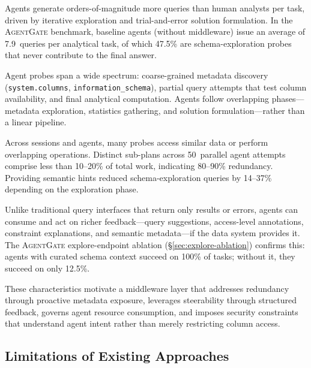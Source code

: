 \documentclass[sigconf, nonacm]{acmart}
\newcommand{\sysname}{\textsc{AgentGate}\xspace}  %
\begin{document}
\begin{description}[leftmargin=*,labelwidth=1.5cm]
  \item[Scale.]
    Agents generate orders-of-magnitude more queries than human analysts per
    task, driven by iterative exploration and trial-and-error solution
    formulation.  In the \sysname benchmark, baseline agents (without
    middleware) issue an average of 7.9~queries per analytical task, of which
    47.5\% are schema-exploration probes that never contribute to the final
    answer.

  \item[Heterogeneity.]
    Agent probes span a wide spectrum: coarse-grained metadata discovery
    (\texttt{system.columns}, \texttt{information\_schema}), partial query
    attempts that test column availability, and final analytical computation.
    Agents follow overlapping phases---metadata exploration, statistics
    gathering, and solution formulation---rather than a linear pipeline.

  \item[Redundancy.]
    Across sessions and agents, many probes access similar data or perform
    overlapping operations.  Distinct sub-plans across 50~parallel agent
    attempts comprise less than 10--20\% of total
    work, indicating 80--90\% redundancy.  Providing semantic hints reduced
    schema-exploration queries by 14--37\% depending on the exploration phase.

  \item[Steerability.]
    Unlike traditional query interfaces that return only results or errors,
    agents can consume and act on richer feedback---query suggestions,
    access-level annotations, constraint explanations, and semantic
    metadata---if the data system provides it.  The \sysname explore-endpoint
    ablation (\S\ref{sec:explore-ablation}) confirms this: agents with
    curated schema context succeed on 100\% of tasks; without it, they
    succeed on only 12.5\%.
\end{description}

These characteristics motivate a middleware layer that addresses redundancy
through proactive metadata exposure, leverages steerability through structured
feedback, governs agent resource consumption, and imposes security constraints
that understand agent intent rather than merely restricting column access.

\subsection{Limitations of Existing Approaches}
\label{sec:limitations}
\end{document}
